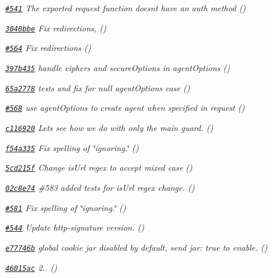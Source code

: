 \begin{DoxyItemize}
\item {\itshape \href{https://github.com/mikeal/request/pull/541}{\tt \#541} The exported request function doesn\textquotesingle{}t have an auth method ()}
\item {\itshape \href{https://github.com/mikeal/request/commit/3040bbe5de846811151dab8dc09944acc93a338e}{\tt 3040bbe} Fix redirections, ()}
\item {\itshape \href{https://github.com/mikeal/request/pull/564}{\tt \#564} Fix redirections ()}
\item {\itshape \href{https://github.com/mikeal/request/commit/397b4350fcf885460d7dced94cf1db1f5c167f80}{\tt 397b435} handle ciphers and secure\+Options in agent\+Options ()}
\item {\itshape \href{https://github.com/mikeal/request/commit/65a27782db7d2798b6490ea08efacb8f3b0a401c}{\tt 65a2778} tests and fix for null agent\+Options case ()}
\item {\itshape \href{https://github.com/mikeal/request/pull/568}{\tt \#568} use agent\+Options to create agent when specified in request ()}
\item {\itshape \href{https://github.com/mikeal/request/commit/c116920a2cbef25afe2e1bbcf4df074e1e2f9dbb}{\tt c116920} Let\textquotesingle{}s see how we do with only the main guard. ()}
\item {\itshape \href{https://github.com/mikeal/request/commit/f54a3358119298634a7b0c29a21bf1471fc23d98}{\tt f54a335} Fix spelling of \char`\"{}ignoring.\char`\"{} ()}
\item {\itshape \href{https://github.com/mikeal/request/commit/5cd215f327e113dc6c062634e405c577986cfd3c}{\tt 5cd215f} Change is\+Url regex to accept mixed case ()}
\item {\itshape \href{https://github.com/mikeal/request/commit/02c8e749360a47d45e3e7b51b7f751fe498d2f25}{\tt 02c8e74} \#583 added tests for is\+Url regex change. ()}
\item {\itshape \href{https://github.com/mikeal/request/pull/581}{\tt \#581} Fix spelling of \char`\"{}ignoring.\char`\"{} ()}
\item {\itshape \href{https://github.com/mikeal/request/pull/544}{\tt \#544} Update http-\/signature version. ()}
\item {\itshape \href{https://github.com/mikeal/request/commit/e77746bf42e974dc91a84d03f44f750dd7ee0989}{\tt e77746b} global cookie jar disabled by default, send jar\+: true to enable. ()}
\item {\itshape \href{https://github.com/mikeal/request/commit/46015ac8d5b74f8107a6ec9fd07c133f46c5d833}{\tt 46015ac} 2.. ()}

\end{DoxyItemize}
